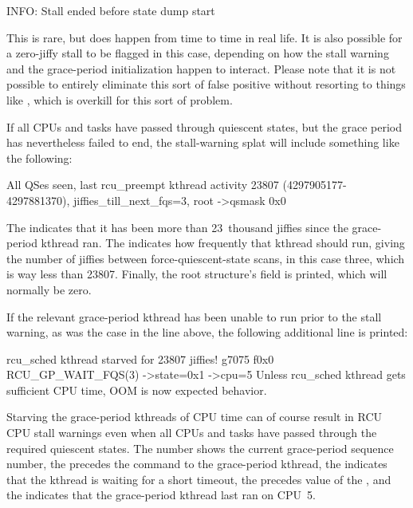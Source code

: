\begin{VerbatimU}
	INFO: Stall ended before state dump start
\end{VerbatimU}

This is rare, but does happen from time to time in real life.
It is also
possible for a zero-jiffy stall to be flagged in this case, depending
on how the stall warning and the grace-period initialization happen to
interact.
Please note that it is not possible to entirely eliminate this
sort of false positive without resorting to things like ,
which is overkill for this sort of problem.

If all CPUs and tasks have passed through quiescent states, but the
grace period has nevertheless failed to end, the stall-warning splat
will include something like the following:

\begin{VerbatimU}[breaklines=true]
	All QSes seen, last rcu_preempt kthread activity 23807 (4297905177-4297881370), jiffies_till_next_fqs=3, root ->qsmask 0x0
\end{VerbatimU}

The  indicates that it has been more than 23~thousand jiffies
since the grace-period kthread ran.
The 
indicates how frequently that kthread should run, giving the number
of jiffies between force-quiescent-state scans, in this case three,
which is way less than 23807.
Finally, the root  structure's
 field is printed, which will normally be zero.

If the relevant grace-period kthread has been unable to run prior to
the stall warning, as was the case in the  line above,
the following additional line is printed:

\begin{VerbatimU}[breaklines=true]
	rcu_sched kthread starved for 23807 jiffies! g7075 f0x0 RCU_GP_WAIT_FQS(3) ->state=0x1 ->cpu=5
	Unless rcu_sched kthread gets sufficient CPU time, OOM is now expected behavior.
\end{VerbatimU}


Starving the grace-period kthreads of CPU time can of course result
in RCU CPU stall warnings even when all CPUs and tasks have passed
through the required quiescent states.
The  number shows the current
grace-period sequence number, the  precedes the  command
to the grace-period kthread, the  indicates that the
kthread is waiting for a short timeout, the  precedes value of the
 , and the  indicates that the grace-period
kthread last ran on CPU~5.

